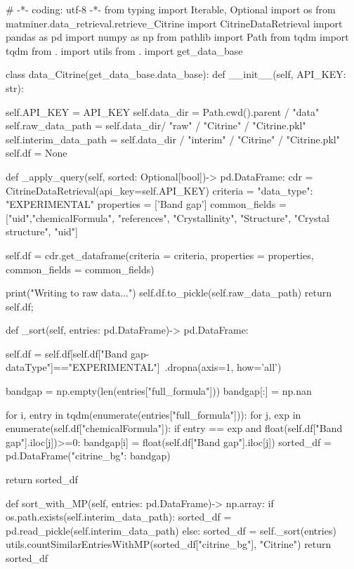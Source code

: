 # -*- coding: utf-8 -*-
from typing import Iterable, Optional
import os
from matminer.data_retrieval.retrieve_Citrine import CitrineDataRetrieval
import pandas as pd
import numpy as np
from pathlib import Path
from tqdm import tqdm
from . import utils
from . import get_data_base

class data_Citrine(get_data_base.data_base):
    def __init__(self, API_KEY: str):

        self.API_KEY = API_KEY
        self.data_dir = Path.cwd().parent / "data"
        self.raw_data_path = self.data_dir/ "raw" / "Citrine" / "Citrine.pkl"
        self.interim_data_path = self.data_dir / "interim" / "Citrine" / "Citrine.pkl"
        self.df = None

    def _apply_query(self, sorted: Optional[bool])-> pd.DataFrame:
        cdr = CitrineDataRetrieval(api_key=self.API_KEY)
        criteria  = {"data_type": "EXPERIMENTAL"}
        properties = ['Band gap']
        common_fields = ["uid","chemicalFormula", "references", "Crystallinity", "Structure", "Crystal structure", "uid"]

        self.df = cdr.get_dataframe(criteria = criteria,
                           properties = properties,
                           common_fields = common_fields)

        print("Writing to raw data...")
        self.df.to_pickle(self.raw_data_path)
        return self.df;

    def _sort(self, entries: pd.DataFrame)-> pd.DataFrame:

        self.df = self.df[self.df["Band gap-dataType"]=="EXPERIMENTAL"]\
                                            .dropna(axis=1, how='all')

        bandgap = np.empty(len(entries["full_formula"]))
        bandgap[:] = np.nan

        for i, entry in tqdm(enumerate(entries["full_formula"])):
            for j, exp in enumerate(self.df["chemicalFormula"]):
                if entry == exp and float(self.df["Band gap"].iloc[j])>=0:
                    bandgap[i] = float(self.df["Band gap"].iloc[j])
        sorted_df = pd.DataFrame({"citrine_bg": bandgap})

        return sorted_df

    def sort_with_MP(self, entries: pd.DataFrame)-> np.array:
        if os.path.exists(self.interim_data_path):
            sorted_df = pd.read_pickle(self.interim_data_path)
        else:
            sorted_df = self._sort(entries)
        utils.countSimilarEntriesWithMP(sorted_df["citrine_bg"], "Citrine")
        return sorted_df

